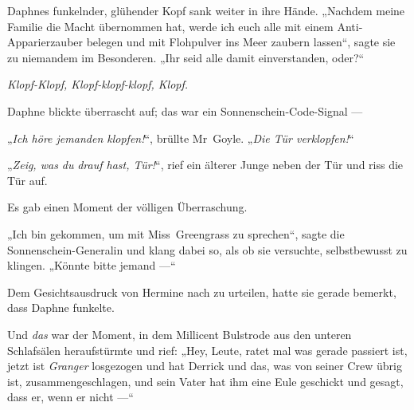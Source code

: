 Daphnes funkelnder, glühender Kopf sank weiter in ihre Hände.
„Nachdem meine Familie die Macht übernommen hat, werde ich euch alle mit einem Anti-Apparierzauber belegen und mit Flohpulver ins Meer zaubern lassen“, sagte sie zu niemandem im Besonderen.
„Ihr seid alle damit einverstanden, oder?“

\emph{Klopf-Klopf, Klopf-klopf-klopf, Klopf.}

Daphne blickte überrascht auf; das war ein Sonnenschein-Code-Signal —

„\emph{Ich höre jemanden klopfen!}“, brüllte Mr~Goyle.
„\emph{Die Tür verklopfen!}“

„\emph{Zeig, was du} \emph{drauf hast, Tür!}“, rief ein älterer Junge neben der Tür und riss die Tür auf.

Es gab einen Moment der völligen Überraschung.

„Ich bin gekommen, um mit Miss~Greengrass zu sprechen“, sagte die Sonnenschein-Generalin und klang dabei so, als ob sie versuchte, selbstbewusst zu klingen.
„Könnte bitte jemand —“

Dem Gesichtsausdruck von Hermine nach zu urteilen, hatte sie gerade bemerkt, dass Daphne funkelte.

Und \emph{das} war der Moment, in dem Millicent Bulstrode aus den unteren Schlafsälen heraufstürmte und rief:
„Hey, Leute, ratet mal was gerade passiert ist, jetzt ist \emph{Granger} losgezogen und hat Derrick und das, was von seiner Crew übrig ist, zusammengeschlagen, und sein Vater hat ihm eine Eule geschickt und gesagt, dass er, wenn er nicht —“

